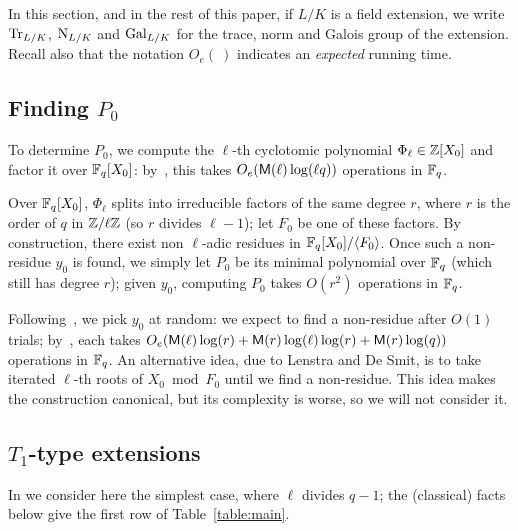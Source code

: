 \documentclass{sig-alternate}
\newcommand{\Cyc}{\Phi}  %
\begin{document}
In this section, and in the rest of this paper, if $L/K$ is a field
extension, we write $\operatorname{Tr}_{L/K}$, $\operatorname{N}_{L/K}$ and $\operatorname{Gal}_{L/K}$ for
the trace, norm and Galois group of the extension. Recall also that
the notation $O_e(\ )$ indicates an {\em expected} running time.


\subsection{Finding $P_0$}

To determine $P_0$, we compute the $\ell$-th cyclotomic polynomial
$\Cyc_\ell \in \Z[X_0]$ and factor it over $\mathbb{F}_q[X_0]$:
by~\cite[Th.~9]{shoup94}, this takes $O_e(\mathsf{M}(\ell)\log(\ell q))$
operations in $\mathbb{F}_q$.

Over $\mathbb{F}_q[X_0]$, $\Cyc_\ell$ splits into irreducible factors of the
same degree $r$, where $r$ is the order of $q$ in $\mathbb{Z}/\ell\mathbb{Z}$ (so $r$
divides $\ell-1$); let $F_0$ be one of these factors. By construction,
there exist non $\ell$-adic residues in $\mathbb{F}_q[X_0]/\langle F_0
\rangle$. Once such a non-residue $y_0$ is found, we simply let $P_0$
be its minimal polynomial over $\mathbb{F}_q$ (which still has degree $r$);
given $y_0$, computing $P_0$ takes $O(r^2)$ operations in $\mathbb{F}_q$.

Following~\cite{Shoup90,shoup94,couveignes+lercier11}, we pick $y_0$
at random: we expect to find a non-residue after $O(1)$ trials;
by~\cite[Lemma~15]{shoup94}, each takes
$O_e(\mathsf{M}(\ell)\log(r)+\mathsf{M}(r)\log(\ell)\log(r)+\mathsf{M}(r)\log(q))$
operations in $\mathbb{F}_q$. An alternative idea, due to Lenstra and De Smit,
is to take iterated $\ell$-th roots of $X_0 \bmod F_0$ until we find a
non-residue.  This idea makes the construction canonical, but its
complexity is worse, so we will not consider it.


\subsection{$T_1$-type extensions}\label{ssec:T1}

In we consider here the simplest case, where $\ell$ divides $q-1$; the
(classical) facts below give the first row of Table~\ref{table:main}.
\end{document}
